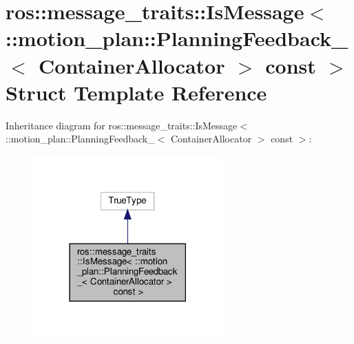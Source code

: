 \hypertarget{structros_1_1message__traits_1_1IsMessage_3_01_1_1motion__plan_1_1PlanningFeedback___3_01ContainerAllocator_01_4_01const_01_4}{}\section{ros\+:\+:message\+\_\+traits\+:\+:Is\+Message$<$ \+:\+:motion\+\_\+plan\+:\+:Planning\+Feedback\+\_\+$<$ Container\+Allocator $>$ const $>$ Struct Template Reference}
\label{structros_1_1message__traits_1_1IsMessage_3_01_1_1motion__plan_1_1PlanningFeedback___3_01ContainerAllocator_01_4_01const_01_4}


Inheritance diagram for ros\+:\+:message\+\_\+traits\+:\+:Is\+Message$<$ \+:\+:motion\+\_\+plan\+:\+:Planning\+Feedback\+\_\+$<$ Container\+Allocator $>$ const $>$\+:
\nopagebreak
\begin{figure}[H]
\begin{center}
\leavevmode
\includegraphics[width=206pt]{structros_1_1message__traits_1_1IsMessage_3_01_1_1motion__plan_1_1PlanningFeedback___3_01Contain886b32f151654ced906db1dcff86fe9d}
\end{center}
\end{figure}


